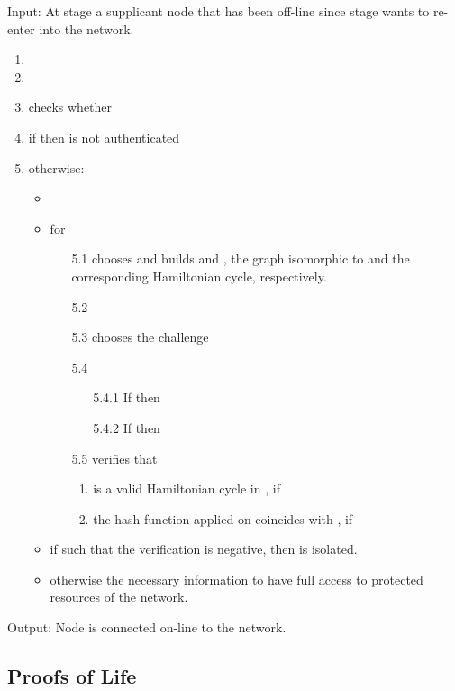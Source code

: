\documentclass{article}
\begin{document}
Input: At stage  a supplicant node  that has been off-line
since stage  wants to re-enter into the network.
\begin{enumerate}
    \item 
    \item  
    \item  checks whether 
    \item  if  then  is not authenticated
    \item  otherwise:
    \begin{itemize}
        \item 
        \item for 
        \begin{enumerate}
             \item [5.1]   chooses  and builds   and , the graph
             isomorphic to  and the corresponding Hamiltonian cycle, respectively.
             \item [5.2] 
             \item [5.3]  chooses  the challenge 
             \item [5.4] 
             \begin{enumerate}
                    \item [5.4.1] If  then 
                    \item [5.4.2] If  then 
             \end{enumerate}
             \item [5.5]  verifies that
             \begin{enumerate}
                \item  is a valid Hamiltonian cycle in , if 
                \item the hash function  applied on  coincides with , if 
             \end{enumerate}
        \end{enumerate}
        \item if  such that the verification is negative, then  is 							isolated.
        \item otherwise  the necessary information to have full access
            to protected resources of the network.
    \end{itemize}   
\end{enumerate}   
  
Output:  Node  is connected on-line to the network.


\subsection{Proofs of Life}
\end{document}
